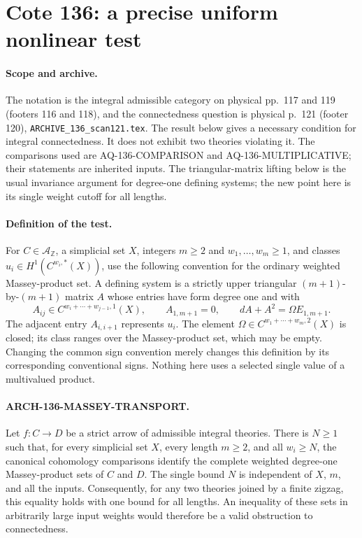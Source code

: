 \section{Cote 136: a precise uniform nonlinear test}
\label{sec:136masseytransport}

\paragraph{Scope and archive.}
The notation is the integral admissible category on physical
pp.~117 and 119 (footers 116 and 118), and the connectedness
question is physical p.~121 (footer 120),
\texttt{ARCHIVE\_136\_scan121.tex}. The result below gives a
necessary condition for integral connectedness. It does not
exhibit two theories violating it. The comparisons used are
AQ-136-COMPARISON and AQ-136-MULTIPLICATIVE; their statements
are inherited inputs. The triangular-matrix lifting below is
the usual invariance argument for degree-one defining systems;
the new point here is its single weight cutoff for all lengths.

\paragraph{Definition of the test.}
For $C\in\mathcal A_{\mathbb Z}$, a simplicial set $X$, integers
$m\geq2$ and $w_1,\ldots,w_m\geq1$, and classes
$u_i\in H^1(C^{w_i,*}(X))$, use the following convention for
the ordinary weighted Massey-product set. A defining system
is a strictly upper triangular $(m+1)$-by-$(m+1)$ matrix $A$
whose entries have form degree one and with
\[
 A_{ij}\in C^{w_i+\cdots+w_{j-1},1}(X),\qquad
 A_{1,m+1}=0,
 \qquad dA+A^2=\Omega E_{1,m+1}.                         \tag{136.MT1}
\]
The adjacent entry $A_{i,i+1}$ represents $u_i$. The element
$\Omega\in C^{w_1+\cdots+w_m,2}(X)$ is closed; its class
ranges over the Massey-product set, which may be empty.
Changing the common sign convention merely changes this
definition by its corresponding conventional signs. Nothing
here uses a selected single value of a multivalued product.

\paragraph{ARCH-136-MASSEY-TRANSPORT.}
Let $f:C\to D$ be a strict arrow of admissible integral
theories. There is $N\geq1$ such that, for every simplicial
set $X$, every length $m\geq2$, and all $w_i\geq N$, the
canonical cohomology comparisons identify the complete
weighted degree-one Massey-product sets of $C$ and $D$.
The single bound $N$ is independent of $X$, $m$, and all
the inputs. Consequently, for any two theories joined by
a finite zigzag, this equality holds with one bound for
all lengths. An inequality of these sets in arbitrarily
large input weights would therefore be a valid obstruction
to connectedness.

